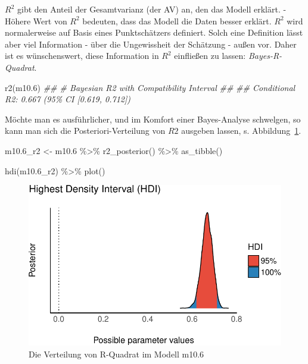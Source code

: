\documentclass[
  a4paper,
  DIV=11]{scrreprt}
\newenvironment{Shaded}{\begin{snugshade}}{\end{snugshade}}
\newcommand{\DocumentationTok}[1]{\textcolor[rgb]{0.37,0.37,0.37}{\textit{#1}}}
\newcommand{\FloatTok}[1]{\textcolor[rgb]{0.68,0.00,0.00}{#1}}
\newcommand{\FunctionTok}[1]{\textcolor[rgb]{0.28,0.35,0.67}{#1}}
\newcommand{\NormalTok}[1]{\textcolor[rgb]{0.00,0.23,0.31}{#1}}
\newcommand{\OtherTok}[1]{\textcolor[rgb]{0.00,0.23,0.31}{#1}}
\newcommand{\SpecialCharTok}[1]{\textcolor[rgb]{0.37,0.37,0.37}{#1}}
\theoremstyle{definition}
\theoremstyle{remark}
\begin{document}
\(R^2\) gibt den Anteil der Gesamtvarianz (der AV) an, den das Modell
erklärt. - Höhere Wert von \(R^2\) bedeuten, dass das Modell die Daten
besser erklärt. \(R^2\) wird normalerweise auf Basis eines
Punktschätzers definiert. Solch eine Definition lässt aber viel
Information - über die Ungewissheit der Schätzung - außen vor. Daher ist
es wünschenswert, diese Information in \(R^2\) einfließen zu lassen:
\emph{Bayes-R-Quadrat}.

\begin{Shaded}
\begin{Highlighting}[]
\FunctionTok{r2}\NormalTok{(m10}\FloatTok{.6}\NormalTok{)}
\DocumentationTok{\#\# \# Bayesian R2 with Compatibility Interval}
\DocumentationTok{\#\# }
\DocumentationTok{\#\#   Conditional R2: 0.667 (95\% CI [0.619, 0.712])}
\end{Highlighting}
\end{Shaded}

Möchte man es ausführlicher, und im Komfort einer Bayes-Analyse
schwelgen, so kann man sich die Posteriori-Verteilung von \(R2\)
ausgeben lassen, s. Abbildung~\ref{fig-m106-r2}.

\begin{Shaded}
\begin{Highlighting}[]
\NormalTok{m10}\FloatTok{.6}\NormalTok{\_r2 }\OtherTok{\textless{}{-}}
\NormalTok{m10}\FloatTok{.6} \SpecialCharTok{\%\textgreater{}\%} 
  \FunctionTok{r2\_posterior}\NormalTok{() }\SpecialCharTok{\%\textgreater{}\%} 
  \FunctionTok{as\_tibble}\NormalTok{()}

\FunctionTok{hdi}\NormalTok{(m10}\FloatTok{.6}\NormalTok{\_r2) }\SpecialCharTok{\%\textgreater{}\%} 
  \FunctionTok{plot}\NormalTok{()}
\end{Highlighting}
\end{Shaded}

\begin{figure}[H]

{\centering \includegraphics{./metrische-AV_files/figure-pdf/fig-m106-r2-1.pdf}

}

\caption{\label{fig-m106-r2}Die Verteilung von R-Quadrat im Modell
m10.6}

\end{figure}
\end{document}
